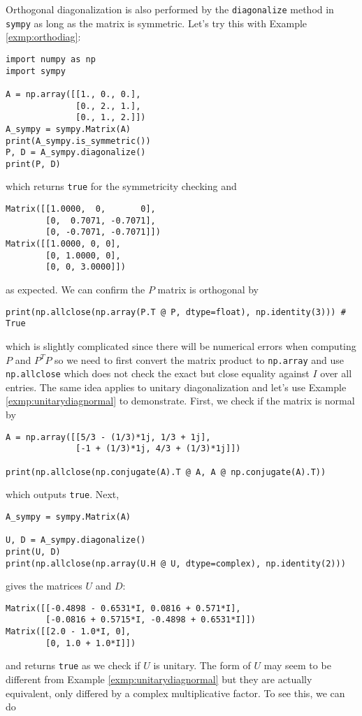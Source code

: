 Orthogonal diagonalization is also performed by the \verb|diagonalize| method in \texttt{sympy} as long as the matrix is symmetric. Let's try this with Example \ref{exmp:orthodiag}:
\begin{lstlisting}
import numpy as np
import sympy

A = np.array([[1., 0., 0.],
              [0., 2., 1.],
              [0., 1., 2.]])
A_sympy = sympy.Matrix(A)
print(A_sympy.is_symmetric())
P, D = A_sympy.diagonalize()
print(P, D)    
\end{lstlisting}
which returns \verb|true| for the symmetricity checking and
\begin{lstlisting}
Matrix([[1.0000,  0,       0], 
        [0,  0.7071, -0.7071], 
        [0, -0.7071, -0.7071]])
Matrix([[1.0000, 0, 0], 
        [0, 1.0000, 0], 
        [0, 0, 3.0000]])    
\end{lstlisting}
as expected. We can confirm the $P$ matrix is orthogonal by
\begin{lstlisting}
print(np.allclose(np.array(P.T @ P, dtype=float), np.identity(3))) # True
\end{lstlisting}
which is slightly complicated since there will be numerical errors when computing $P$ and $P^T P$ so we need to first convert the matrix product to \verb|np.array| and use \verb|np.allclose| which does not check the exact but close equality against $I$ over all entries. The same idea applies to unitary diagonalization and let's use Example \ref{exmp:unitarydiagnormal} to demonstrate. First, we check if the matrix is normal by 
\begin{lstlisting}
A = np.array([[5/3 - (1/3)*1j, 1/3 + 1j],
              [-1 + (1/3)*1j, 4/3 + (1/3)*1j]])

print(np.allclose(np.conjugate(A).T @ A, A @ np.conjugate(A).T))
\end{lstlisting}
which outputs \verb|true|. Next,
\begin{lstlisting}
A_sympy = sympy.Matrix(A)

U, D = A_sympy.diagonalize()
print(U, D)
print(np.allclose(np.array(U.H @ U, dtype=complex), np.identity(2)))   
\end{lstlisting}
gives the matrices $U$ and $D$:
\begin{lstlisting}
Matrix([[-0.4898 - 0.6531*I, 0.0816 + 0.571*I], 
        [-0.0816 + 0.5715*I, -0.4898 + 0.6531*I]]) 
Matrix([[2.0 - 1.0*I, 0], 
        [0, 1.0 + 1.0*I]])  
\end{lstlisting}
and returns \verb|true| as we check if $U$ is unitary. The form of $U$ may seem to be different from Example \ref{exmp:unitarydiagnormal} but they are actually equivalent, only differed by a complex multiplicative factor. To see this, we can do
